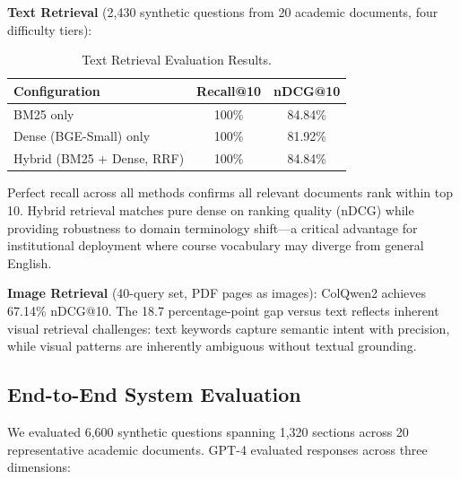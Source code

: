 \documentclass[11pt,a4paper,twocolumn]{article}
\begin{document}
\textbf{Text Retrieval} (2,430 synthetic questions from 20 academic documents, four difficulty tiers):

\begin{table}[t]
\caption{Text Retrieval Evaluation Results.}
\label{tab:text-retrieval}
\centering
\begin{tabular}{lcc}
\toprule
\textbf{Configuration} & \textbf{Recall@10} & \textbf{nDCG@10} \\
\midrule
BM25 only & 100\% & 84.84\% \\
Dense (BGE-Small) only & 100\% & 81.92\% \\
Hybrid (BM25 + Dense, RRF) & 100\% & 84.84\% \\
\bottomrule
\end{tabular}
\end{table}

Perfect recall across all methods confirms all relevant documents rank within top 10. Hybrid retrieval matches pure dense on ranking quality (nDCG) while providing robustness to domain terminology shift—a critical advantage for institutional deployment where course vocabulary may diverge from general English.

\textbf{Image Retrieval} (40-query set, PDF pages as images): ColQwen2 achieves 67.14\% nDCG@10. The 18.7 percentage-point gap versus text reflects inherent visual retrieval challenges: text keywords capture semantic intent with precision, while visual patterns are inherently ambiguous without textual grounding.

\subsection{End-to-End System Evaluation}

We evaluated 6,600 synthetic questions spanning 1,320 sections across 20 representative academic documents. GPT-4 evaluated responses across three dimensions:
\end{document}
